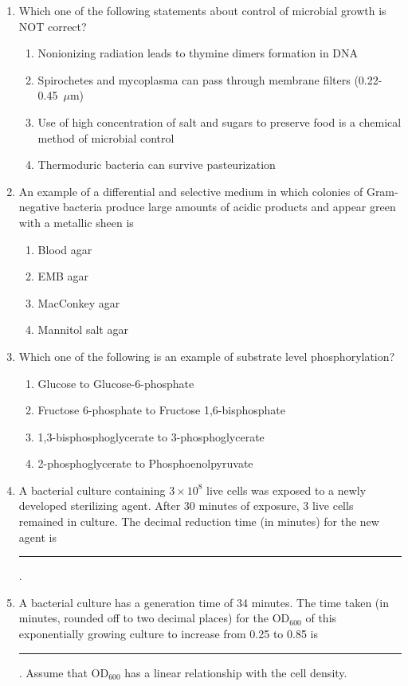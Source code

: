 \documentclass[journal,12pt,onecolumn]{IEEEtran}
\begin{document}
\begin{enumerate}[label=\arabic*.,resume]
\item Which one of the following statements about control of microbial growth is NOT correct?
\begin{enumerate}[label=(\Alph*)]
\item Nonionizing radiation leads to thymine dimers formation in DNA
\item Spirochetes and mycoplasma can pass through membrane filters (0.22-0.45~$\mu$m)
\item Use of high concentration of salt and sugars to preserve food is a chemical method of microbial control
\item Thermoduric bacteria can survive pasteurization
\end{enumerate}

\item An example of a differential and selective medium in which colonies of Gram-negative bacteria produce large amounts of acidic products and appear green with a metallic sheen is
\begin{multicols}{2}
\begin{enumerate}[label=(\Alph*)]
\item Blood agar
\item EMB agar
\item MacConkey agar
\item Mannitol salt agar
\end{enumerate}
\end{multicols}
\item Which one of the following is an example of substrate level phosphorylation?
\begin{enumerate}[label=(\Alph*)]
\item Glucose to Glucose-6-phosphate
\item Fructose 6-phosphate to Fructose 1,6-bisphosphate
\item 1,3-bisphosphoglycerate to 3-phosphoglycerate
\item 2-phosphoglycerate to Phosphoenolpyruvate
\end{enumerate}

\item A bacterial culture containing $3 \times 10^8$ live cells was exposed to a newly developed sterilizing agent. After 30 minutes of exposure, 3 live cells remained in culture. The decimal reduction time (in minutes) for the new agent is \rule{2.5cm}{0.1pt}.

\item A bacterial culture has a generation time of 34 minutes. The time taken (in minutes, rounded off to two decimal places) for the OD$_{600}$ of this exponentially growing culture to increase from 0.25 to 0.85 is \rule{2.5cm}{0.1pt}. Assume that OD$_{600}$ has a linear relationship with the cell density.


\end{enumerate}
\end{document}
